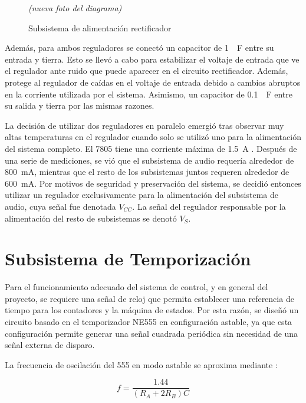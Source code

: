 \documentclass[12pt,onecolumn]{IEEEtran}
\begin{document}
\begin{figure}[H]
    \centering
    \begin{center}\textit{(nueva foto del diagrama)}\end{center}
    \caption{Subsistema de alimentación rectificador}
    \label{fig:bloque1_555}
\end{figure}

Además, para ambos reguladores se conectó un capacitor de \qty{1}{\mu F} entre su entrada y tierra. Esto se llevó a cabo para estabilizar el voltaje de entrada que ve el regulador ante ruido que puede aparecer en el circuito rectificador. Además, protege al regulador de caídas en el voltaje de entrada debido a cambios abruptos en la corriente utilizada por el sistema. Asimismo, un capacitor de \qty{0.1}{\mu F} entre su salida y tierra por las mismas razones. \cite{7805datasheet}

La decisión de utilizar dos reguladores en paralelo emergió tras observar muy altas temperaturas en el regulador cuando solo se utilizó uno para la alimentación del sistema completo. El 7805 tiene una corriente máxima de \qty{1.5}{A} \cite{7805datasheet}. Después de una serie de mediciones, se vió que el subsistema de audio requería alrededor de \qty{800}{mA}, mientras que el resto de los subsistemas juntos requeren alrededor de \qty{600}{mA}. Por motivos de seguridad y preservación del sistema, se decidió entonces utilizar un regulador exclusivamente para la alimentación del subsistema de audio, cuya señal fue denotada $V_{CC}$. La señal del regulador responsable por la alimentación del resto de subsistemas se denotó $V_S$.

\section{Subsistema de Temporización}

Para el funcionamiento adecuado del sistema de control, y en general del proyecto, se requiere una señal de reloj que permita establecer una referencia de tiempo para los contadores y la máquina de estados. Por esta razón, se diseñó un circuito basado en el temporizador NE555 en configuración astable, ya que esta configuración permite generar una señal cuadrada periódica sin necesidad de una señal externa de disparo.

La frecuencia de oscilación del 555 en modo astable se aproxima mediante \cite{electronicafp}:

\begin{equation}
	\label{eq:NE555}
    f = \frac{1.44}{(R_A + 2R_B)C}
\end{equation}
\end{document}
